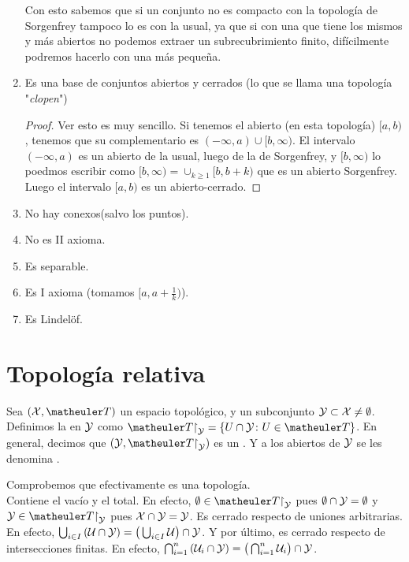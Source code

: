 \begin{exa}
\begin{enumerate}
	
	Con esto sabemos que si un conjunto no es compacto con la topología de Sorgenfrey tampoco lo es con la usual, ya que si con una que tiene los mismos y más abiertos no podemos extraer un subrecubrimiento finito, difícilmente podremos hacerlo con una más pequeña.
	\item Es una base de conjuntos abiertos y cerrados (lo que se llama una topología "\textit{clopen}")
	\begin{proof}
		Ver esto es muy sencillo. Si tenemos el abierto (en esta topología) $[a,b)$, tenemos que su complementario es $(-\infty, a) \cup [b,\infty)$. El intervalo $(-\infty, a)$ es un abierto de la usual, luego de la de Sorgenfrey, y $[b,\infty)$ lo poedmos escribir como $[b,\infty) = \cup_{k\geq1} [b, b+k)$ que es un abierto Sorgenfrey. Luego el intervalo $[a,b)$ es un abierto-cerrado.
	\end{proof}
	\item No hay conexos(salvo los puntos).
	\item No es II axioma.
	\item Es separable.
	\item Es I axioma (tomamos $[a, a+\frac{1}{k})$).
	\item Es Lindelöf.
	\end{enumerate}
\end{exa}


\section{Topología relativa}

\begin{defi}
	Sea $(\X,\T)$ un espacio topológico, y un subconjunto $\mathcal{Y}\subset\mathcal{X} \neq \emptyset$. Definimos la  en $\mathcal{Y}$ como $\T\restriction_\mc{Y} = \{U\cap\mc{Y}\colon U\in\T\}$.
	En general, decimos que $(\mc{Y},\T\restriction_\mc{Y})$ es un . Y a los abiertos de $\mathcal{Y}$ se les denomina .
\end{defi}
	
	Comprobemos que efectivamente es una topología. \\
	Contiene el vacío y el total. En efecto, $\emptyset \in \T\restriction_\mc{Y}$ pues $\emptyset \cap \mathcal{Y} = \emptyset$ y $\mc{Y} \in \T\restriction_\mc{Y}$ pues $\mathcal{X} \cap \mathcal{Y} = \mathcal{Y}$. 
	Es cerrado respecto de uniones arbitrarias. En efecto, $\bigcup_{i \in I}{(\mathcal{U} \cap \mathcal{Y})} = \big( \bigcup_{i \in I} \mathcal{U} \big) \cap \mathcal{Y}$. Y por último, es cerrado respecto de intersecciones finitas. En efecto, $\bigcap_{i = 1}^{n}{(\mathcal{U}_i \cap \mathcal{Y})} = \big( \bigcap_{i=1}^{n} \mathcal{U}_i \big) \cap \mathcal{Y}$. \\

